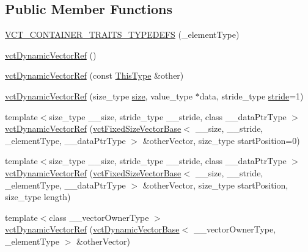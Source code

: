 \subsection*{Public Member Functions}
\begin{DoxyCompactItemize}
\item 
\hyperlink{classvct_dynamic_vector_ref_a7b91ca027434e642a95493c01d9f4850}{V\+C\+T\+\_\+\+C\+O\+N\+T\+A\+I\+N\+E\+R\+\_\+\+T\+R\+A\+I\+T\+S\+\_\+\+T\+Y\+P\+E\+D\+E\+F\+S} (\+\_\+element\+Type)
\item 
\hyperlink{classvct_dynamic_vector_ref_a94dc8bfb87bb02b8c6864df04ba13b54}{vct\+Dynamic\+Vector\+Ref} ()
\item 
\hyperlink{classvct_dynamic_vector_ref_aa33fd081ff01a142874aa28ea63a1222}{vct\+Dynamic\+Vector\+Ref} (const \hyperlink{classvct_dynamic_vector_ref_adde8a247e72c476120c26cfa15a37c6d}{This\+Type} \&other)
\item 
\hyperlink{classvct_dynamic_vector_ref_a3651eeb9024ce9fa002b891595e0c71f}{vct\+Dynamic\+Vector\+Ref} (size\+\_\+type \hyperlink{classvct_dynamic_const_vector_base_a79950d8cced7fd4e790d9ac2ca1c43a7}{size}, value\+\_\+type $\ast$data, stride\+\_\+type \hyperlink{classvct_dynamic_const_vector_base_af0440ce847480b353e9f85edccc03158}{stride}=1)
\item 
{\footnotesize template$<$size\+\_\+type \+\_\+\+\_\+size, stride\+\_\+type \+\_\+\+\_\+stride, class \+\_\+\+\_\+data\+Ptr\+Type $>$ }\\\hyperlink{classvct_dynamic_vector_ref_a1bfc3a8bf0cb548aed6749c863f5a51e}{vct\+Dynamic\+Vector\+Ref} (\hyperlink{classvct_fixed_size_vector_base}{vct\+Fixed\+Size\+Vector\+Base}$<$ \+\_\+\+\_\+size, \+\_\+\+\_\+stride, \+\_\+element\+Type, \+\_\+\+\_\+data\+Ptr\+Type $>$ \&other\+Vector, size\+\_\+type start\+Position=0)
\item 
{\footnotesize template$<$size\+\_\+type \+\_\+\+\_\+size, stride\+\_\+type \+\_\+\+\_\+stride, class \+\_\+\+\_\+data\+Ptr\+Type $>$ }\\\hyperlink{classvct_dynamic_vector_ref_adce7f010121a1d319af95c647a858691}{vct\+Dynamic\+Vector\+Ref} (\hyperlink{classvct_fixed_size_vector_base}{vct\+Fixed\+Size\+Vector\+Base}$<$ \+\_\+\+\_\+size, \+\_\+\+\_\+stride, \+\_\+element\+Type, \+\_\+\+\_\+data\+Ptr\+Type $>$ \&other\+Vector, size\+\_\+type start\+Position, size\+\_\+type length)
\item 
{\footnotesize template$<$class \+\_\+\+\_\+vector\+Owner\+Type $>$ }\\\hyperlink{classvct_dynamic_vector_ref_a4d2eafa71764b8ac451d301a7032cc72}{vct\+Dynamic\+Vector\+Ref} (\hyperlink{classvct_dynamic_vector_base}{vct\+Dynamic\+Vector\+Base}$<$ \+\_\+\+\_\+vector\+Owner\+Type, \+\_\+element\+Type $>$ \&other\+Vector)

\end{DoxyCompactItemize}
